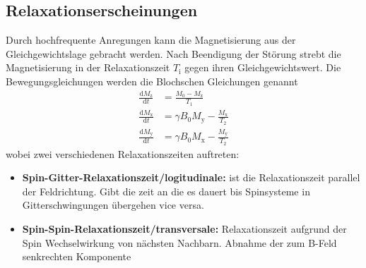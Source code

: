 \subsection{Relaxationserscheinungen}%
\label{sub:relaxationserscheinungen}
Durch hochfrequente Anregungen kann die Magnetisierung aus der
Gleichgewichtslage gebracht werden.
Nach Beendigung der Störung strebt die Magnetisierung in der Relaxationszeit
$T_\text{i}$ gegen ihren Gleichgewichtswert. 
Die Bewegungsgleichungen werden die Blochschen Gleichungen genannt
\begin{align}
		\frac{\text{d} M_\text{z}}{\text{d} t} &= \frac{M_0 - M_\text{z}}{T_1} \\
		\frac{\text{d} M_\text{x}}{\text{d} t} &= \gamma B_0 M_\text{y} -
		\frac{M_\text{x}}{T_2} \\               
		\frac{\text{d} M_\text{y}}{\text{d} t} &= \gamma B_0 M_\text{x} - \frac{M_\text{y}}{T_2} 
\end{align}
wobei zwei verschiedenen Relaxationszeiten auftreten:
\begin{itemize}
		\item \textbf{Spin-Gitter-Relaxationszeit/logitudinale:}
				ist die Relaxationszeit parallel der Feldrichtung. Gibt die zeit
				an die es dauert bis Spinsysteme in Gitterschwingungen
				übergehen vice versa. 
		\item \textbf{Spin-Spin-Relaxationszeit/transversale:} Relaxationszeit
				aufgrund der Spin Wechselwirkung von nächsten Nachbarn. Abnahme
				der zum B-Feld senkrechten Komponente
\end{itemize}

